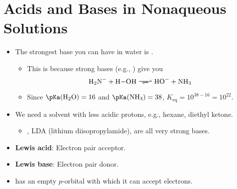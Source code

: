 \documentclass[../notes.tex]{subfiles}
\begin{document}
\section{Acids and Bases in Nonaqueous Solutions}
\begin{itemize}
    \item {}The strongest base you can have in water is .
    \begin{itemize}
        \item This is because strong bases (e.g., ) give you
        \begin{equation*}
            \ce{H2N- + H-OH <=>> HO- + NH3}
        \end{equation*}
        \item Since $\pKa(\ce{H2O})=16$ and $\pKa(\ce{NH3})=38$, $K_\text{eq}=10^{38-16}=10^{22}$.
    \end{itemize}
    \item We need a solvent with less acidic protons, e.g., hexane, diethyl ketone.
    \begin{itemize}
        \item {}, LDA (lithium diisopropylamide),  are all very strong bases.
    \end{itemize}
    \item \textbf{Lewis acid}: Electron pair acceptor.
    \item \textbf{Lewis base}: Electron pair donor.
    \item {} has an empty $p$-orbital with which it can accept electrons.
\end{itemize}
\end{document}
